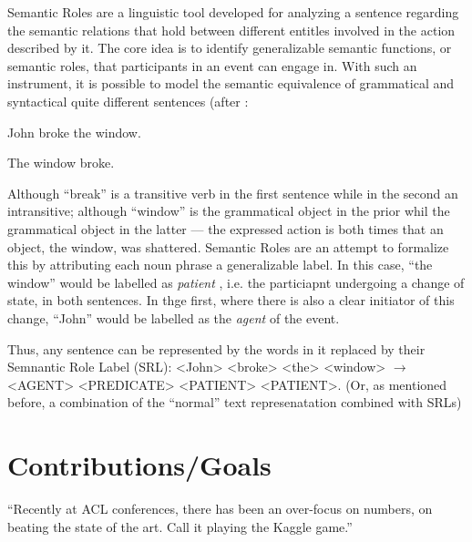 Semantic Roles are a linguistic tool developed for analyzing a sentence regarding the semantic
relations that hold between different entitles involved in the action described by it. The core
idea is to identify generalizable semantic functions, or semantic roles, that participants in an
event can engage in. With such an instrument, it is possible to model the semantic equivalence
of grammatical and syntactical quite different sentences (after \cite{palmer2010semantic}:

\begin{examples}
  \item John broke the window.
  \item The window broke.
\end{examples}

Although ``break'' is a transitive verb in the first sentence while in the second
an intransitive; although ``window'' is the grammatical object in the prior whil
the grammatical object in the latter --- the expressed action is both times that
an object, the window, was shattered.
Semantic Roles are an attempt to formalize this by attributing each noun phrase
a generalizable label. In this case, ``the window'' would be labelled as \emph{patient}
, i.e. the particiapnt undergoing a change of state, in both sentences.
In thge first, where there is also a clear initiator of this change, ``John''
would be labelled as the \emph{agent} of the event.

Thus, any sentence can be represented by the words in it replaced by their Semnantic Role Label
(SRL): <John> <broke> <the> <window> $\rightarrow$ <AGENT> <PREDICATE> <PATIENT> <PATIENT>.
(Or, as mentioned before, a combination of the ``normal'' text represenatation combined with SRLs)




\section{Contributions/Goals}


``Recently at ACL conferences, there has been
an over-focus on numbers, on beating the state of the art. Call it playing the Kaggle
game.'' \citep[p.~702]{manning2015computational}

